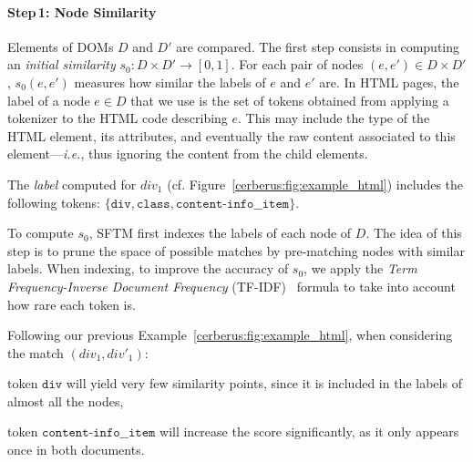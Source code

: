 \paragraph{Step\,1: Node Similarity}\label{cerberus:sec:node_similarity}
Elements of DOMs $D$ and $D'$ are compared. 
The first step consists in computing an \emph{initial similarity} $s_0 : D \times D' \to [0, 1]$.
For each pair of nodes $(e, e') \in D \times D'$, $s_0(e,e')$ measures how similar the labels of $e$ and $e'$ are.
In HTML pages, the label of a node $e \in D$ that we use is the set of tokens obtained from applying a tokenizer to the HTML code describing $e$. 
This may include the type of the HTML element, its attributes, and eventually the raw content associated to this element---\emph{i.e.}, thus ignoring the content from the child elements.
\begin{ex}
The \emph{label} computed for $div_1$ (cf. Figure~\ref{cerberus:fig:example_html}) includes the following tokens: $\{\texttt{div}, \texttt{class}, \texttt{content-info\_\_item} \}$. %
\end{ex}

To compute $s_0$, SFTM first indexes the labels of each node of $D$.
The idea of this step is to prune the space of possible matches by pre-matching nodes with similar labels.
When indexing, to improve the accuracy of $s_0$, we apply the \emph{Term Frequency-Inverse Document Frequency} (TF-IDF)~\cite{jones1972statistical} formula to take into account how rare each token is.
\begin{ex}
    Following our previous Example~\ref{cerberus:fig:example_html}, when considering the match $(div_1, div'_1)$:
    \begin{compactenum}
        \item token $\texttt{div}$ will yield very few similarity points, since it is included in the labels of almost all the nodes,
        \item token $\texttt{content-info\_\_item}$ will increase the score significantly, as it only appears once in both documents.
    \end{compactenum}
\end{ex}

